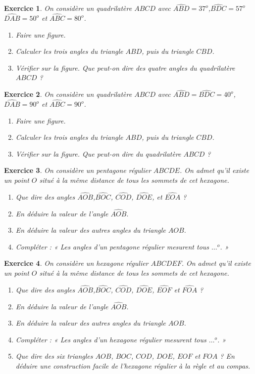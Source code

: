 \documentclass[12 pt]{article}
\theoremstyle{plain}
\newcounter{n}
\numberwithin{n}{section}
\newtheorem{exo}{Exercice}
\begin{document}
\begin{exo}
On considère un quadrilatère $ABCD$ avec $\widehat{ABD}=37^o$,$\widehat{BDC}=57^o$ $\widehat{DAB}= 50^o$ et $\widehat{ABC}= 80^o$. 
\begin{enumerate}
\item Faire une figure.
\item Calculer les trois angles du triangle $ABD$, puis du triangle $CBD$.
\item Vérifier sur la figure. Que peut-on dire des quatre angles du quadrilatère $ABCD$ ?
\end{enumerate}
\end{exo}

\begin{exo}
On considère un quadrilatère $ABCD$ avec $\widehat{ABD}=\widehat{BDC}=40^o$, $\widehat{DAB}= 90^o$ et $\widehat{ABC}= 90^o$. 
\begin{enumerate}
\item Faire une figure.
\item Calculer les trois angles du triangle $ABD$, puis du triangle $CBD$.
\item Vérifier sur la figure. Que peut-on dire du quadrilatère $ABCD$ ?
\end{enumerate}
\end{exo}

\begin{exo}
On considère un pentagone régulier $ABCDE$. 
On admet qu'il existe un point $O$ situé à la même distance de tous les sommets de cet hexagone. 
\begin{enumerate}
\item Que dire des angles $\widehat{AOB}$,$\widehat{BOC}$, $\widehat{COD}$, $\widehat{DOE}$, et $\widehat{EOA}$ ?
\item En déduire la valeur de l'angle $\widehat{AOB}$. 
\item En déduire la valeur des autres angles du triangle $AOB$. 
\item Compléter : « Les angles d'un pentagone régulier mesurent tous $\ldots^o$. »
\end{enumerate}
\end{exo}

\begin{exo}
On considère un hexagone régulier $ABCDEF$. 
On admet qu'il existe un point $O$ situé à la même distance de tous les sommets de cet hexagone. 
\begin{enumerate}
\item Que dire des angles $\widehat{AOB}$,$\widehat{BOC}$, $\widehat{COD}$, $\widehat{DOE}$, $\widehat{EOF}$ et $\widehat{FOA}$ ?
\item En déduire la valeur de l'angle $\widehat{AOB}$. 
\item En déduire la valeur des autres angles du triangle $AOB$.
\item Compléter : « Les angles d'un hexagone régulier mesurent tous $\ldots^o$. »
\item Que dire des six triangles $AOB$, $BOC$, $COD$, $DOE$, $EOF$ et $FOA$ ? En déduire une construction facile de l'hexagone régulier à la règle et au compas.
\end{enumerate}
\end{exo}

	
\end{document}
